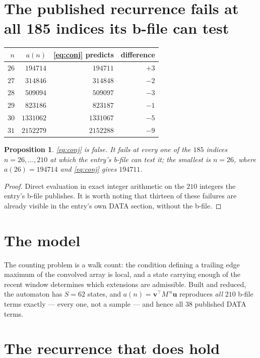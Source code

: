 \documentclass[11pt,a4paper]{article}
\theoremstyle{plain}
\newtheorem{proposition}[theorem]{Proposition}
\theoremstyle{definition}
\begin{document}
\section{The published recurrence fails at all 185 indices its b-file can test}

\begin{center}\small
\begin{tabular}{rrrr}
\toprule
$n$ & $a(n)$ & \eqref{eq:conj} predicts & difference \\
\midrule
$26$ & $194714$ & $194711$ & $+3$\\
$27$ & $314846$ & $314848$ & $-2$\\
$28$ & $509094$ & $509097$ & $-3$\\
$29$ & $823186$ & $823187$ & $-1$\\
$30$ & $1331062$ & $1331067$ & $-5$\\
$31$ & $2152279$ & $2152288$ & $-9$\\
\bottomrule
\end{tabular}
\end{center}

\begin{proposition}\label{prop:false}
\eqref{eq:conj} is false. It fails at every one of the $185$ indices $n=26,\dots,210$ at which
the entry's b-file can test it; the smallest is $n=26$, where $a(26)=194714$ and
\eqref{eq:conj} gives $194711$.
\end{proposition}

\begin{proof}
Direct evaluation in exact integer arithmetic on the $210$ integers the entry's b-file
publishes. It is worth noting that thirteen of these failures are already visible in the
entry's own DATA section, without the b-file.
\end{proof}

\section{The model}

The counting problem is a walk count: the condition defining a trailing edge maximum of the
convolved array is local, and a state carrying enough of the recent window determines which
extensions are admissible. Built and reduced, the automaton has $S=62$ states, and
$a(n)=\mathbf v^{\!\top}M^{\,n}\mathbf u$ reproduces \emph{all} $210$ b-file terms exactly ---
every one, not a sample --- and hence all $38$ published DATA terms.

\section{The recurrence that does hold}
\end{document}
